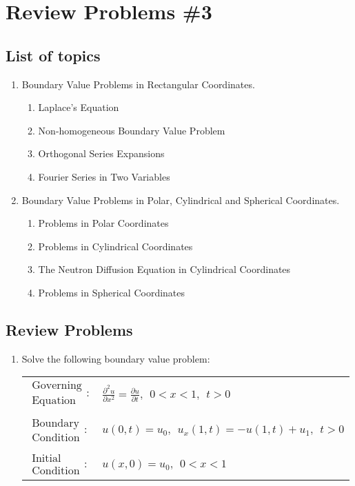 \chapter{Review Problems \#3}
\label{ch:rev3}
\begin{fullwidth}
\section{List of topics}

\begin{enumerate}
\item Boundary Value Problems in Rectangular Coordinates.
\begin{enumerate}
\item Laplace's Equation
\item Non-homogeneous Boundary Value Problem
\item Orthogonal Series Expansions
\item Fourier Series in Two Variables
\end{enumerate}
\item Boundary Value Problems in Polar, Cylindrical and Spherical Coordinates.
\begin{enumerate}
\item Problems in Polar Coordinates
\item Problems in Cylindrical Coordinates
\item The Neutron Diffusion Equation in Cylindrical Coordinates
\item Problems in Spherical Coordinates
\end{enumerate}

\end{enumerate}

\section{Review Problems}

\begin{enumerate}
\item Solve the following boundary value problem:
\begin{table}[h!]
\begin{tabular}{l l}
$\substack{\text{Governing} \\\text{Equation}}: $& $\frac{\partial^2 u}{\partial x^2} = \frac{\partial u}{\partial t}, \ \ 0<x<1, \ \ t>0$ \\
& \\
$\substack{\text{Boundary} \\ \text{Condition}}: $& $u(0,t)=u_0, \ \ u_{x}(1,t) = -u(1,t)+u_1, \ \ t>0 $\\
& \\
$\substack{\text{Initial} \\ \text{Condition}}: $ & $u(x,0) = u_0, \ \ 0 < x < 1$ \\
\end{tabular}
\end{table}


\end{enumerate}
\end{fullwidth}
